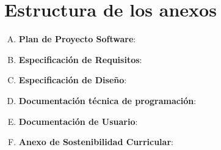 \section{Estructura de los anexos}
     \begin{enumerate} [A.]
         \item \textbf{Plan de Proyecto Software}:
         \item \textbf{Especificación de Requisitos}:
         \item \textbf{Especificación de Diseño}:
         \item \textbf{Documentación técnica de programación}:
         \item \textbf{Documentación de Usuario}:
         \item \textbf{Anexo de Sostenibilidad Curricular}:
     \end{enumerate}



